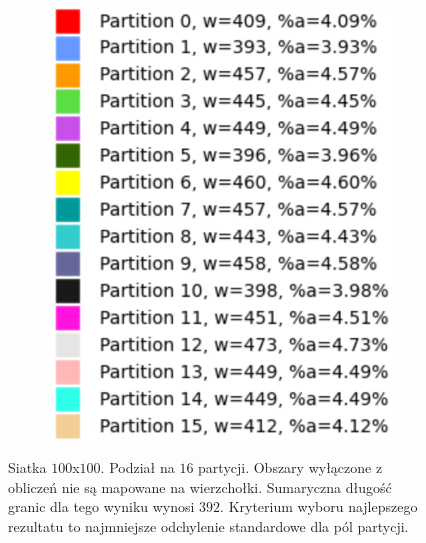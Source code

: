 \begin{figure}[h]
\begin{subfigure}{.33\textwidth}
    \caption[short]{}
\end{subfigure}%
\begin{subfigure}{.33\textwidth}
    \centering
    \includegraphics[width=0.9\linewidth]{images/results/m_k/with/15/results}
    \caption[short]{}
\end{subfigure}
\caption{Siatka $100$x$100$. Podział na $16$ partycji.
Obszary wyłączone z obliczeń nie są mapowane na wierzchołki.
Sumaryczna długość granic dla tego wyniku wynosi $392$.
Kryterium wyboru najlepszego rezultatu to najmniejsze odchylenie standardowe dla pól partycji.}
\label{result:15}
\end{figure}
